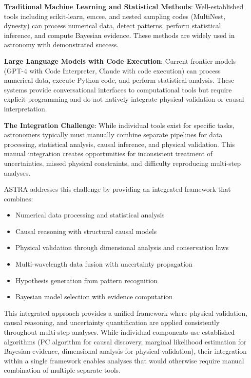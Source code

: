 \documentclass[usenatbib]{rasti}
\begin{document}
\textbf{Traditional Machine Learning and Statistical Methods}: Well-established tools including scikit-learn, emcee, and nested sampling codes (MultiNest, dynesty) can process numerical data, detect patterns, perform statistical inference, and compute Bayesian evidence. These methods are widely used in astronomy with demonstrated success.

\textbf{Large Language Models with Code Execution}: Current frontier models (GPT-4 with Code Interpreter, Claude with code execution) can process numerical data, execute Python code, and perform statistical analysis. These systems provide conversational interfaces to computational tools but require explicit programming and do not natively integrate physical validation or causal interpretation.

\textbf{The Integration Challenge}: While individual tools exist for specific tasks, astronomers typically must manually combine separate pipelines for data processing, statistical analysis, causal inference, and physical validation. This manual integration creates opportunities for inconsistent treatment of uncertainties, missed physical constraints, and difficulty reproducing multi-step analyses.

ASTRA addresses this challenge by providing an integrated framework that combines:
\begin{itemize}
\item Numerical data processing and statistical analysis
\item Causal reasoning with structural causal models
\item Physical validation through dimensional analysis and conservation laws
\item Multi-wavelength data fusion with uncertainty propagation
\item Hypothesis generation from pattern recognition
\item Bayesian model selection with evidence computation
\end{itemize}

This integrated approach provides a unified framework where physical validation, causal reasoning, and uncertainty quantification are applied consistently throughout multi-step analyses. While individual components use established algorithms (PC algorithm for causal discovery, marginal likelihood estimation for Bayesian evidence, dimensional analysis for physical validation), their integration within a single framework enables analyses that would otherwise require manual combination of multiple separate tools.
\end{document}
